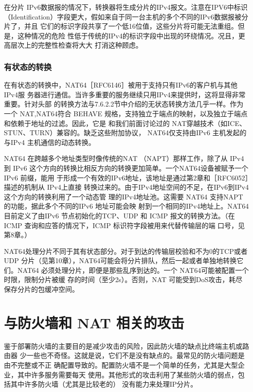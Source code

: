 在分片 IPv6数据报的情况下，转换器将生成分片的IPv4报文。注意在IPV6中标识
（Identification）字段更大，假如来自于同一台主机的多个不同的IPv6数据报被分片了，并且
它们的标识字段共享了一个低16位值，这些分片将可能无法重组。但是，这种情况的危险
性低于传统的IPv4的标识字段中出现的环绕情况。况且，更高层次上的完整性检查将大大
打消这种顾虑。

\subsubsection{有状态的转换}

在有状态的转换中，NAT64［RFC6146］被用于支持只有IPv6的客户机与其他IPv4服
务器进行通信。当许多重要的服务继续只用IPv4来提供时，这将显得非常重要。针对头部
的转换方法与7.6.2.2节中介绍的无状态转换方法几乎一样。作为一个 NAT,NAT64符合
BEHAVE 规格，支持独立于端点的映射，以及独立于端点和依赖于地址的过滤。因此，它是
和我们前面讨论过的 NAT穿越技术（如ICE、STUN、TURN）兼容的。缺乏这些附加协议，
NAT64仅支持由IPv6 主机发起的与IPv4 主机通信的动态转换。

NAT64 在跨越多个地址类型时像传统的NAT （NAPT）那样工作，除了从 IPv4到 IPv6
这个方向的转换比相反方向的转换更加简单。一个NAT64设备被赋予一个 IPv6 前缀，能用
于形成一个有效的IPv6地址，该地址是通过第2章和［RFC6052］描述的机制从 IPv4上直接
转换过来的。由于IPv4地址空间的不足，在IPv6到IPv4这个方向的转换利用了一个动态管
理的IPv4地址池。这需要 NAT64 支持NAPT的功能，据此多个不同的IPv6 地址可能会映
射到一个相同的IPv4地址上。NAT64目前定义了由IPv6 节点初始化的TCP、UDP 和 ICMP
报文的转换方法。（在ICMP 查询和应答的情况下，ICMP 标识符字段被用来代替传输层的端
口号，见第8章。）

NAT64处理分片不同于其有状态部分。对于到达的传输层校验和不为0的TCP或者
UDP 分片（见第10章），NAT64可能会将分片排队，然后一起或者单独地转换它们。NAT64
必须处理分片，即便是那些乱序到达的。一个 NAT64可能被配置一个时限，限制分片被缓
存的时间（至少2s）。否则，NAT 可能受到DoS攻击，耗尽保存分片的包缓冲空间。

\section{与防火墙和 NAT 相关的攻击}

鉴于部署防火墙的主要目的是减少攻击的风险，因此防火墙的缺点比终端主机或路由器
少一些也不奇怪。这就是说，它们不是没有缺点的。最常见的防火墙问题是由不完整或不正
确配置导致的。配置防火墙不是一个简单的任务，尤其是大型企业，其中许多服务需要每天
使用。其他形式的攻击利用了某些防火墙的弱点，包括其中许多防火墙（尤其是比较老的）
没有能力来处理IP分片。

